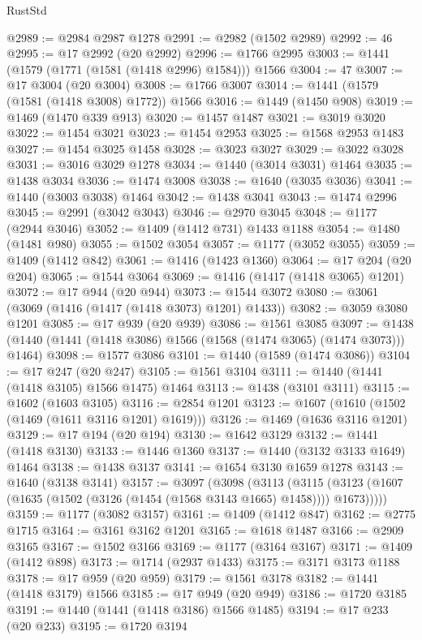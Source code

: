 \begin{lexlean}{RustStd}
\begin{coremodule}
@2989 := @2984 @2987 @1278
@2991 := @2982 (@1502 @2989)
@2992 := 46
@2995 := @17 @2992 (@20 @2992)
@2996 := @1766 @2995
@3003 := @1441 (@1579 (@1771 (@1581 (@1418 @2996) @1584))) @1566
@3004 := 47
@3007 := @17 @3004 (@20 @3004)
@3008 := @1766 @3007
@3014 := @1441 (@1579 (@1581 (@1418 @3008) @1772)) @1566
@3016 := @1449 (@1450 @908)
@3019 := @1469 (@1470 @339 @913)
@3020 := @1457 @1487
@3021 := @3019 @3020
@3022 := @1454 @3021
@3023 := @1454 @2953
@3025 := @1568 @2953 @1483
@3027 := @1454 @3025 @1458
@3028 := @3023 @3027
@3029 := @3022 @3028
@3031 := @3016 @3029 @1278
@3034 := @1440 (@3014 @3031) @1464
@3035 := @1438 @3034
@3036 := @1474 @3008
@3038 := @1640 (@3035 @3036)
@3041 := @1440 (@3003 @3038) @1464
@3042 := @1438 @3041
@3043 := @1474 @2996
@3045 := @2991 (@3042 @3043)
@3046 := @2970 @3045
@3048 := @1177 (@2944 @3046)
@3052 := @1409 (@1412 @731) @1433 @1188
@3054 := @1480 (@1481 @980)
@3055 := @1502 @3054
@3057 := @1177 (@3052 @3055)
@3059 := @1409 (@1412 @842)
@3061 := @1416 (@1423 @1360)
@3064 := @17 @204 (@20 @204)
@3065 := @1544 @3064
@3069 := @1416 (@1417 (@1418 @3065) @1201)
@3072 := @17 @944 (@20 @944)
@3073 := @1544 @3072
@3080 := @3061 (@3069 (@1416 (@1417 (@1418 @3073) @1201) @1433))
@3082 := @3059 @3080 @1201
@3085 := @17 @939 (@20 @939)
@3086 := @1561 @3085
@3097 := @1438 (@1440 (@1441 (@1418 @3086) @1566 (@1568 (@1474 @3065) (@1474 @3073))) @1464)
@3098 := @1577 @3086
@3101 := @1440 (@1589 (@1474 @3086))
@3104 := @17 @247 (@20 @247)
@3105 := @1561 @3104
@3111 := @1440 (@1441 (@1418 @3105) @1566 @1475) @1464
@3113 := @1438 (@3101 @3111)
@3115 := @1602 (@1603 @3105)
@3116 := @2854 @1201
@3123 := @1607 (@1610 (@1502 (@1469 (@1611 @3116 @1201) @1619)))
@3126 := @1469 (@1636 @3116 @1201)
@3129 := @17 @194 (@20 @194)
@3130 := @1642 @3129
@3132 := @1441 (@1418 @3130)
@3133 := @1446 @1360
@3137 := @1440 (@3132 @3133 @1649) @1464
@3138 := @1438 @3137
@3141 := @1654 @3130 @1659 @1278
@3143 := @1640 (@3138 @3141)
@3157 := @3097
    (@3098
      (@3113
        (@3115 (@3123 (@1607 (@1635 (@1502 (@3126 (@1454 (@1568 @3143 @1665) @1458)))) @1673)))))
@3159 := @1177 (@3082 @3157)
@3161 := @1409 (@1412 @847)
@3162 := @2775 @1715
@3164 := @3161 @3162 @1201
@3165 := @1618 @1487
@3166 := @2909 @3165
@3167 := @1502 @3166
@3169 := @1177 (@3164 @3167)
@3171 := @1409 (@1412 @898)
@3173 := @1714 (@2937 @1433)
@3175 := @3171 @3173 @1188
@3178 := @17 @959 (@20 @959)
@3179 := @1561 @3178
@3182 := @1441 (@1418 @3179) @1566
@3185 := @17 @949 (@20 @949)
@3186 := @1720 @3185
@3191 := @1440 (@1441 (@1418 @3186) @1566 @1485)
@3194 := @17 @233 (@20 @233)
@3195 := @1720 @3194

\end{coremodule}
\end{lexlean}
